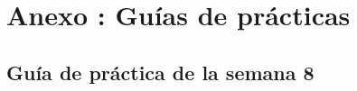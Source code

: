 \documentclass[letter,oneside,12pt,spanish]{report}
\begin{document}


\chapter*{Anexo \thechapter: Guías de prácticas}
\label{anexo:Guía Semana 8}

\section*{Guía de práctica de la semana 8}
\label{anexo:Guía-Semana-8}



\end{document}

